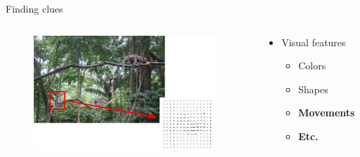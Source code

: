 \documentclass{beamer}[10pt, usepdftitle=false, handout]
\begin{document}
	\begin{frame}

	Finding clues
	\vspace*{1.0em}	
	
\begin{columns}
\begin{column}{0.5\textwidth}
	\begin{figure}
		\includegraphics[scale=0.6]{monkey-7.png} 
	\end{figure}	 
\end{column}
\begin{column}{0.5\textwidth}  %
    \begin{center}
	\begin{itemize}
	\item{Visual features
		\begin{itemize}
		\item{Colors}
		\item{Shapes}
		\item{\textbf{Movements}}
		\item{\textbf{Etc.}}
		\end{itemize}			
	}
	\end{itemize}	     
     
     \end{center}
	\end{column}
	\end{columns}	
				
    \end{frame}
	
		
\end{document}
